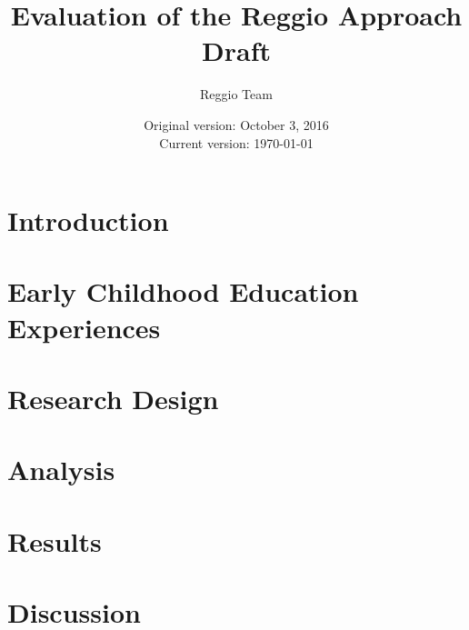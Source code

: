 






\title{\Large \textbf{Evaluation of the Reggio Approach} \\ Draft}
\author{\normalsize Reggio Team}
\date{\normalsize Original version: October 3, 2016 \\ Current version: \today}
\maketitle

\tableofcontents

\clearpage
\doublespacing

\section{Introduction}
\label{sec:introduction}


\section{Early Childhood Education Experiences}
\label{sec:eceexperiences}


\section{Research Design}
\label{sec:data}



\section{Analysis}
\label{sec:methodology}
%


\section{Results}
\label{sec:result}


\section{Discussion}
\label{sec:discussion}


\clearpage






